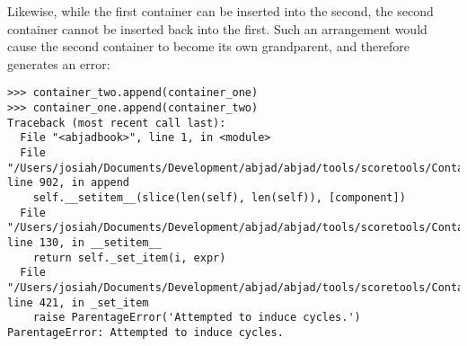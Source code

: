 \noindent Likewise, while the first container can be inserted into the second,
the second container cannot be inserted back into the first. Such an
arrangement would cause the second container to become its own grandparent, and
therefore generates an error:

\begin{comment}
<abjad>[allow_exceptions]
container_two.append(container_one)
container_one.append(container_two)
</abjad>
\end{comment}

\begin{abjadbookoutput}
\begin{singlespacing}
\vspace{-0.5\baselineskip}
\begin{lstlisting}
>>> container_two.append(container_one)
>>> container_one.append(container_two)
Traceback (most recent call last):
  File "<abjadbook>", line 1, in <module>
  File "/Users/josiah/Documents/Development/abjad/abjad/tools/scoretools/Container.py", line 902, in append
    self.__setitem__(slice(len(self), len(self)), [component])
  File "/Users/josiah/Documents/Development/abjad/abjad/tools/scoretools/Container.py", line 130, in __setitem__
    return self._set_item(i, expr)
  File "/Users/josiah/Documents/Development/abjad/abjad/tools/scoretools/Container.py", line 421, in _set_item
    raise ParentageError('Attempted to induce cycles.')
ParentageError: Attempted to induce cycles.
\end{lstlisting}
\end{singlespacing}
\end{abjadbookoutput}

